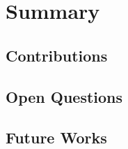 
\chapter{Summary}

\section[Contributions]{Contributions}

\section[Open Questions]{Open Questions}

\section[Future Works]{Future Works}